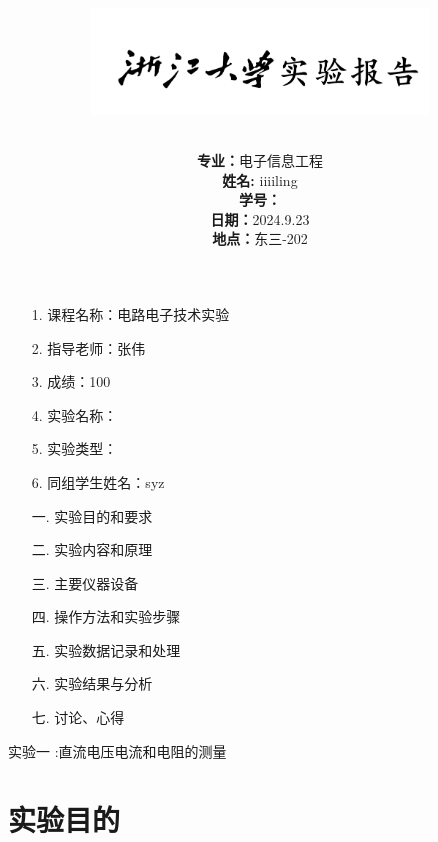 \documentclass[UTF8]{ctexart}
\author{
  \textbf{专业：}电子信息工程 \\[2ex]
  \textbf{姓名:} iiiiling\\[2ex]
  \textbf{学号：}\studentnumber \\[2ex]
  \textbf{日期：}2024.9.23\\[2ex]%
  \textbf{地点：}东三-202\\[2ex]%
}
\title{
    \begin{figure}[htbp]
        \centering
        \includegraphics[width=0.8\textwidth]{img.png}
    \end{figure}
}
\begin{document}
\maketitle

\pagestyle{empty} %

\noindent %

\begin{minipage}[t]{0.45\textwidth}
\begin{enumerate}
    \item[1.] 课程名称：电路电子技术实验
    \item[2.] 指导老师：张伟
    \item[3.] 成绩：100
    \item[4.] 实验名称： 
    \item[5.] 实验类型：
    \item[6.] 同组学生姓名：syz
\end{enumerate}
\end{minipage}%
\hfill %
\begin{minipage}[t]{0.45\textwidth}
\begin{enumerate}
    \item[一.] 实验目的和要求
    \item[二.] 实验内容和原理
    \item[三.] 主要仪器设备
    \item[四.] 操作方法和实验步骤
    \item[五.] 实验数据记录和处理
    \item[六.] 实验结果与分析
    \item[七.] 讨论、心得
\end{enumerate}
\end{minipage}

\vspace{1cm}

\noindent %
\hfill %


\centerline{\Large{ 实验一 :直流电压电流和电阻的测量}}

\section{实验目的}
\subsection{}
\end{document}
